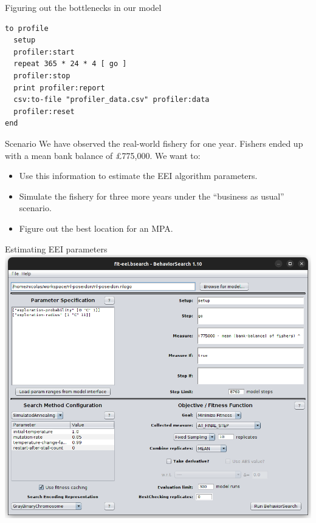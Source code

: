 \documentclass[table, 14pt, aspectratio=169]{beamer}
\begin{document}
\begin{frame}[fragile=singleslide]{Figuring out the bottlenecks in our model}
  \begin{adjustbox}{max height=0.8\textheight, max width = \linewidth}
    \begin{verbatim}  
to profile
  setup                                          
  profiler:start                                 
  repeat 365 * 24 * 4 [ go ]                      
  profiler:stop     
  print profiler:report         
  csv:to-file "profiler_data.csv" profiler:data  
  profiler:reset                                 
end
    \end{verbatim}
  \end{adjustbox}
\end{frame}

\begin{frame}{Scenario}
  \vfill
  We have observed the real-world fishery for one year.
  \vfill
  Fishers ended up with a mean bank balance of £775,000.
  \vfill
  We want to:
  \vfill
  \begin{itemize}
    \item Use this information to estimate the EEI algorithm parameters.
    \vfill
    \item Simulate the fishery for three more years under the ``business as usual'' scenario.
    \vfill
    \item Figure out the best location for an MPA.
  \end{itemize}
  \vfill
\end{frame}

\begin{frame}{Estimating EEI parameters}
  \centering
  \includegraphics[height=0.8\textheight]{images/bsearch_fit_eei.png}
\end{frame}
\end{document}
